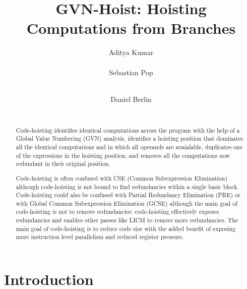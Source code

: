 \documentclass{sig-alternate}
\begin{document}
\def \SCoP {SCoP}
\def \GCC {GCC}
\def \LLVM {LLVM}
\def \SESE {SESE}
\def \CFG {CFG}
\def \SSA {SSA}
\def \scev {scev}

\setlength{\pdfpageheight}{\paperheight}
\setlength{\pdfpagewidth}{\paperwidth}

\title{GVN-Hoist: Hoisting Computations from Branches}


\author{
\alignauthor
Aditya Kumar\\
       \\
\alignauthor
Sebastian Pop\\
       \\
\and
\alignauthor
Daniel Berlin\\
       \\
}

\maketitle
\begin{abstract}
  Code-hoisting identifies identical computations across the program with the
  help of a Global Value Numbering (GVN) analysis, identifies a hoisting
  position that dominates all the identical computations and in which all
  operands are avaialable, duplicates one of the expressions in the hoisting
  position, and removes all the computations now redundant in their original
  position.

  Code-hoisting is often confused with CSE (Common Subexpression Elimination)
  although code-hoisting is not bound to find redundancies within a single basic
  block.  Code-hoisting could also be confused with Partial Redundancy
  Elimination (PRE) or with Global Common Subexpression Elimination (GCSE)
  although the main goal of code-hoisting is not to remove redundancies:
  code-hoisting effectively exposes redundancies and enables other passes like
  LICM to remove more redundancies.  The main goal of code-hoisting is to reduce
  code size with the added benefit of exposing more instruction level
  parallelism and reduced register pressure.
\end{abstract}

\section{Introduction}
\end{document}
